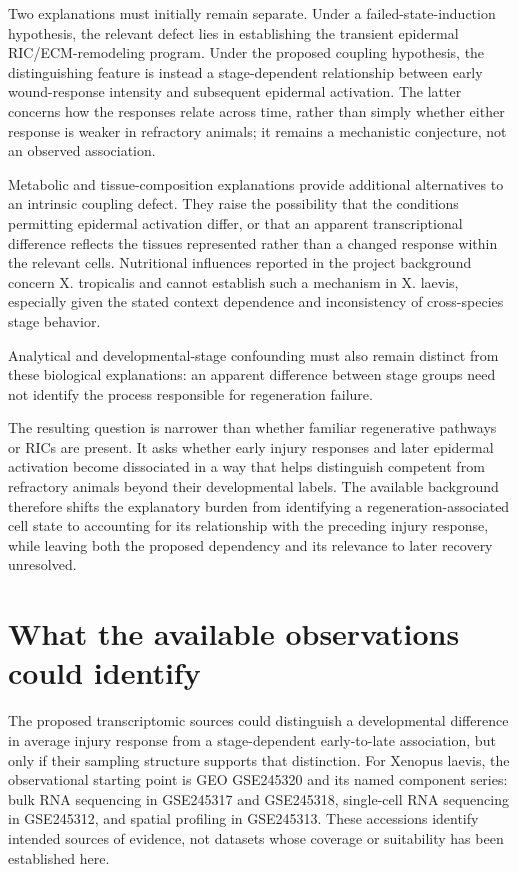 \documentclass[11pt]{article}
\begin{document}
Two explanations must initially remain separate. Under a failed-state-induction hypothesis, the relevant defect lies in establishing the transient epidermal RIC/ECM-remodeling program. Under the proposed coupling hypothesis, the distinguishing feature is instead a stage-dependent relationship between early wound-response intensity and subsequent epidermal activation. The latter concerns how the responses relate across time, rather than simply whether either response is weaker in refractory animals; it remains a mechanistic conjecture, not an observed association.

Metabolic and tissue-composition explanations provide additional alternatives to an intrinsic coupling defect. They raise the possibility that the conditions permitting epidermal activation differ, or that an apparent transcriptional difference reflects the tissues represented rather than a changed response within the relevant cells. Nutritional influences reported in the project background concern X. tropicalis and cannot establish such a mechanism in X. laevis, especially given the stated context dependence and inconsistency of cross-species stage behavior.

Analytical and developmental-stage confounding must also remain distinct from these biological explanations: an apparent difference between stage groups need not identify the process responsible for regeneration failure.

The resulting question is narrower than whether familiar regenerative pathways or RICs are present. It asks whether early injury responses and later epidermal activation become dissociated in a way that helps distinguish competent from refractory animals beyond their developmental labels. The available background therefore shifts the explanatory burden from identifying a regeneration-associated cell state to accounting for its relationship with the preceding injury response, while leaving both the proposed dependency and its relevance to later recovery unresolved.

\section{What the available observations could identify}
The proposed transcriptomic sources could distinguish a developmental difference in average injury response from a stage-dependent early-to-late association, but only if their sampling structure supports that distinction. For Xenopus laevis, the observational starting point is GEO GSE245320 and its named component series: bulk RNA sequencing in GSE245317 and GSE245318, single-cell RNA sequencing in GSE245312, and spatial profiling in GSE245313. These accessions identify intended sources of evidence, not datasets whose coverage or suitability has been established here.
\end{document}
